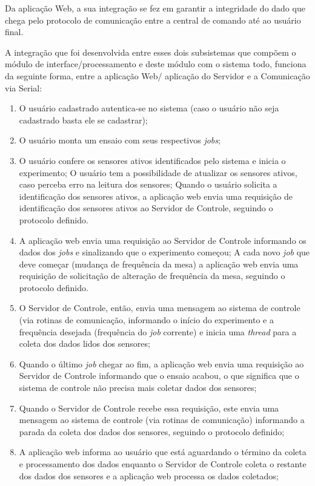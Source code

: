 Da aplicação Web, a sua integração se fez em garantir a integridade do dado que chega pelo protocolo de comunicação entre a central de comando até ao usuário final.

A integração que foi desenvolvida entre esses dois subsistemas que compõem o módulo de interface/processamento e deste módulo com o sistema todo, funciona da seguinte forma, entre a aplicação Web/ aplicação do Servidor e a Comunicação via Serial:

\begin{enumerate}
 \item O usuário cadastrado autentica-se no sistema (caso o usuário não seja cadastrado basta ele se cadastrar);
 \item O usuário monta um ensaio com seus respectivos \textit{jobs};
 \item O usuário confere os sensores ativos identificados pelo sistema e inicia o experimento;
    \subitem O usuário tem a possibilidade de atualizar os sensores ativos, caso perceba erro na leitura dos sensores;
    \subitem Quando o usuário solicita a identificação dos sensores ativos, a aplicação web envia uma requisição de identificação dos sensores ativos ao Servidor de Controle, seguindo o protocolo definido.
 \item A aplicação web envia uma requisição ao Servidor de Controle informando os dados dos \textit{jobs} e sinalizando que o experimento começou;
       \subitem A cada novo \textit{job} que deve começar (mudança de frequência da mesa) a aplicação web envia uma requisição de solicitação de alteração de frequência da mesa, seguindo o protocolo definido.
 \item O Servidor de Controle, então, envia uma mensagem ao sistema de controle (via rotinas de comunicação, informando o início do experimento e a frequência desejada (frequência do \textit{job} corrente) e inicia uma \textit{thread} para a coleta dos dados lidos dos sensores;
 \item Quando o último \textit{job} chegar ao fim, a aplicação web envia uma requisição ao Servidor de Controle informando que o ensaio acabou, o que significa que o sistema de controle não precisa mais coletar dados dos sensores;
 \item Quando o Servidor de Controle recebe essa requisição, este envia uma mensagem ao sistema de controle (via rotinas de comunicação) informando a parada da coleta dos dados dos sensores, seguindo o protocolo definido;
 \item A aplicação web informa ao usuário que está aguardando o término da coleta e processamento dos dados enquanto o Servidor de Controle coleta o restante dos dados dos sensores e a aplicação web processa os dados coletados;

\end{enumerate}
